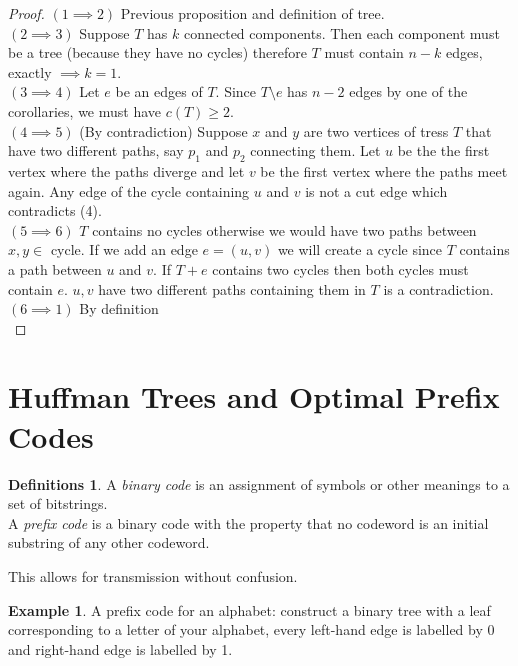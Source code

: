 \documentclass{article}
\theoremstyle{definition}
\newtheorem*{defns}{Definitions}
\newtheorem*{ex}{Example}
\begin{document}
\begin{proof}
$(1\implies 2)$ Previous proposition and definition of tree. \\
$(2\implies 3)$ Suppose $T$ has $k$ connected components.
Then each component must be a tree (because they have no cycles) therefore $T$ must contain $n-k$ edges, exactly $\implies k=1$. \\
$(3\implies 4)$ Let $e$ be an edges of $T$.
Since $T\setminus e$ has $n-2$ edges by one of the corollaries, we must have $c(T)\ge 2$. \\
$(4\implies 5)$ (By contradiction) Suppose $x$ and $y$ are two vertices of tress $T$ that have two different paths, say $p_1$ and $p_2$ connecting them.
Let $u$ be the the first vertex where the paths diverge and let $v$ be the first vertex where the paths meet again.
Any edge of the cycle containing $u$ and $v$ is not a cut edge which contradicts (4). \\
$(5\implies 6)$ $T$ contains no cycles otherwise we would have two paths between $x,y\in$ cycle.
If we add an edge $e= (u,v)$ we will create a cycle since $T$ contains a path between $u$ and $v$. If $T+e$ contains two cycles then both cycles must contain $e$.
$u,v$ have two different paths containing them in $T$ is a contradiction. \\
$(6\implies 1)$ \lbrack By definition \rbrack \\
\end{proof}

\section{Huffman Trees and Optimal Prefix Codes}

\begin{defns}
A \emph{binary code} is an assignment of symbols or other meanings to a set of bitstrings.\\
A \emph{prefix code} is a binary code with the property that no codeword is an initial substring of any other codeword.
\end{defns}

This allows for transmission without confusion.

\begin{ex}
A prefix code for an alphabet: construct a binary tree with a leaf corresponding to a letter of your alphabet, every left-hand edge is labelled by 0 and right-hand edge is labelled by 1.
\end{ex}
\end{document}
